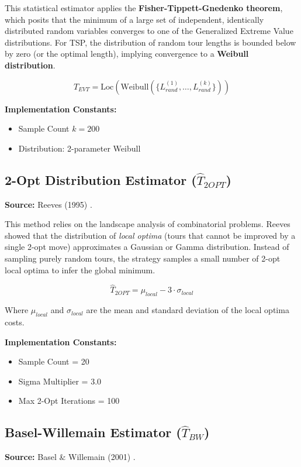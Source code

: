 \documentclass{article}
\begin{document}
This statistical estimator applies the \textbf{Fisher-Tippett-Gnedenko theorem}, which posits that the minimum of a large set of independent, identically distributed random variables converges to one of the Generalized Extreme Value distributions. For TSP, the distribution of random tour lengths is bounded below by zero (or the optimal length), implying convergence to a \textbf{Weibull distribution}.

\begin{equation}
    \hat{T}_{EVT} = \text{Loc}(\text{Weibull}(\{L_{rand}^{(1)}, \dots, L_{rand}^{(k)}\}))
\end{equation}

\noindent \textbf{Implementation Constants:}
\begin{itemize}
    \item Sample Count $k = 200$
    \item Distribution: 2-parameter Weibull
\end{itemize}

\subsection{2-Opt Distribution Estimator ($\hat{T}_{2OPT}$)}
\textbf{Source:} Reeves (1995) \cite{reeves1995}.

This method relies on the landscape analysis of combinatorial problems. Reeves showed that the distribution of \textit{local optima} (tours that cannot be improved by a single 2-opt move) approximates a Gaussian or Gamma distribution. Instead of sampling purely random tours, the strategy samples a small number of 2-opt local optima to infer the global minimum.

\begin{equation}
    \hat{T}_{2OPT} = \mu_{local} - 3 \cdot \sigma_{local}
\end{equation}

\noindent Where $\mu_{local}$ and $\sigma_{local}$ are the mean and standard deviation of the local optima costs.

\noindent \textbf{Implementation Constants:}
\begin{itemize}
    \item Sample Count = 20
    \item Sigma Multiplier = 3.0
    \item Max 2-Opt Iterations = 100
\end{itemize}

\subsection{Basel-Willemain Estimator ($\hat{T}_{BW}$)}
\textbf{Source:} Basel \& Willemain (2001) \cite{basel2001}.
\end{document}
